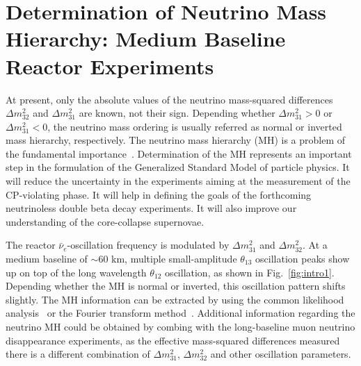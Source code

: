 \newcommand{\fixit}[1]{{\color{red}FIXIT: #1}}
\section{Determination of Neutrino Mass Hierarchy: Medium Baseline Reactor Experiments}

At present, only the absolute values of the neutrino mass-squared differences $\Delta m^2_{32}$ and $\Delta m^2_{31}$ are known, not their sign. 
Depending whether $\Delta m^2_{31}>0$ or $\Delta m^2_{31}<0$, the neutrino mass ordering is usually referred as normal or inverted mass hierarchy, respectively. 
The neutrino mass hierarchy (MH) is a problem of the fundamental importance~\cite{MHwhitepaper}.
Determination of the MH represents an important step in the formulation of the Generalized Standard Model of particle physics. 
It will reduce the uncertainty in the experiments aiming at the measurement of the CP-violating phase. 
It will help in defining the goals of the forthcoming neutrinoless double beta decay experiments.
It will also improve our understanding of the core-collapse supernovae.

The reactor $\bar\nu_e$-oscillation frequency is modulated by $\Delta m^2_{31}$ and $\Delta m^2_{32}$. 
At a medium baseline of $\sim$60 km, multiple small-amplitude $\theta_{13}$ oscillation peaks show up on top of the long wavelength $\theta_{12}$ oscillation, as shown in Fig.~\ref{fig:intro1}.
Depending whether the MH is normal or inverted, this oscillation pattern shifts slightly.
The MH information can be extracted by using the common likelihood analysis~\cite{Li-PRD13} or the Fourier transform method~\cite{Zhan-PRD08,Zhan-PRD09}. 
Additional information regarding the neutrino MH could be obtained by combing with the long-baseline muon neutrino disappearance experiments, as the effective mass-squared differences measured there is a different combination of $\Delta m^2_{31}$, $\Delta m^2_{32}$ and other oscillation parameters.

